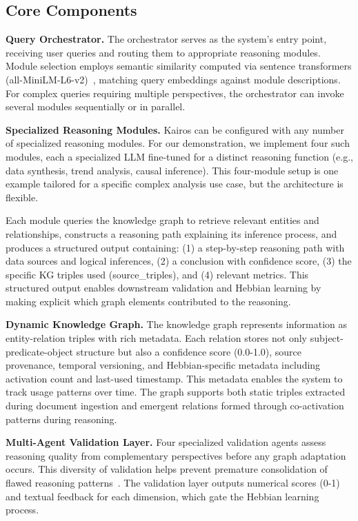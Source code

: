 \documentclass{article}
\begin{document}
\subsection{Core Components}

\textbf{Query Orchestrator.} The orchestrator serves as the system's entry point, receiving user queries and routing them to appropriate reasoning modules. Module selection employs semantic similarity computed via sentence transformers (all-MiniLM-L6-v2)~\citep{reimers2019sentencebert}, matching query embeddings against module descriptions. For complex queries requiring multiple perspectives, the orchestrator can invoke several modules sequentially or in parallel.

\textbf{Specialized Reasoning Modules.} Kairos can be configured with any number of specialized reasoning modules. For our demonstration, we implement four such modules, each a specialized LLM fine-tuned for a distinct reasoning function (e.g., data synthesis, trend analysis, causal inference). This four-module setup is one example tailored for a specific complex analysis use case, but the architecture is flexible.

Each module queries the knowledge graph to retrieve relevant entities and relationships, constructs a reasoning path explaining its inference process, and produces a structured output containing: (1) a step-by-step reasoning path with data sources and logical inferences, (2) a conclusion with confidence score, (3) the specific KG triples used (source\_triples), and (4) relevant metrics. This structured output enables downstream validation and Hebbian learning by making explicit which graph elements contributed to the reasoning.

\textbf{Dynamic Knowledge Graph.} The knowledge graph represents information as entity-relation triples with rich metadata. Each relation stores not only subject-predicate-object structure but also a confidence score (0.0-1.0), source provenance, temporal versioning, and Hebbian-specific metadata including activation count and last-used timestamp. This metadata enables the system to track usage patterns over time. The graph supports both static triples extracted during document ingestion and emergent relations formed through co-activation patterns during reasoning.

\textbf{Multi-Agent Validation Layer.} Four specialized validation agents assess reasoning quality from complementary perspectives before any graph adaptation occurs. This diversity of validation helps prevent premature consolidation of flawed reasoning patterns~\citep{xu2025amem}. The validation layer outputs numerical scores (0-1) and textual feedback for each dimension, which gate the Hebbian learning process.
\end{document}
